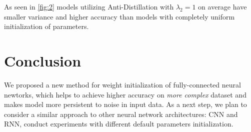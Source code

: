 \documentclass[80pt]{article}
\begin{document}
As seen in \ref{fig:2} models utilizing Anti-Distillation with $\lambda_2 = 1$ on average have smaller variance and higher accuracy than models with completely uniform initialization of parameters.

\section{Conclusion}

We proposed a new method for weight initialization of fully-connected neural newtorks, which helps to achieve higher accuracy on \textit{more complex} dataset and makes model more persistent to noise in input data. As a next step, we plan to consider a similar approach to other neural network architectures: CNN and RNN, conduct experiments with different default parameters initialization.



\end{document}

